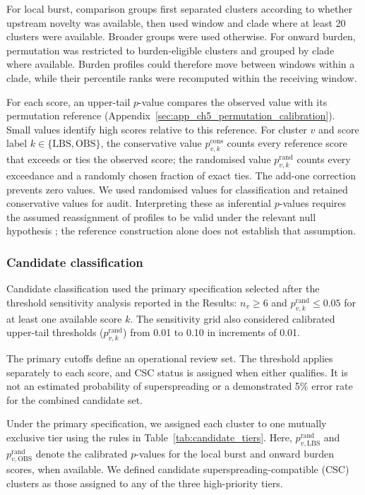 For local burst, comparison groups first separated clusters according to whether upstream novelty was available, then used window and clade where at least 20 clusters were available. Broader groups were used otherwise. For onward burden, permutation was restricted to burden-eligible clusters and grouped by clade where available. Burden profiles could therefore move between windows within a clade, while their percentile ranks were recomputed within the receiving window.

For each score, an upper-tail $p$-value compares the observed value with its permutation reference (Appendix~\ref{sec:app_ch5_permutation_calibration}). Small values identify high scores relative to this reference. For cluster $v$ and score label $k\in\{\mathrm{LBS},\mathrm{OBS}\}$, the conservative value $p_{v,k}^{\mathrm{cons}}$ counts every reference score that exceeds or ties the observed score; the randomised value $p_{v,k}^{\mathrm{rand}}$ counts every exceedance and a randomly chosen fraction of exact ties. The add-one correction prevents zero values. We used randomised values for classification and retained conservative values for audit. Interpreting these as inferential $p$-values requires the assumed reassignment of profiles to be valid under the relevant null hypothesis \citep{Hemerik2017}; the reference construction alone does not establish that assumption.

\subsubsection*{Candidate classification}

Candidate classification used the primary specification selected after the threshold sensitivity analysis reported in the Results: $n_v \geq 6$ and $p_{v,k}^{\mathrm{rand}} \leq 0.05$ for at least one available score $k$. The sensitivity grid also considered calibrated upper-tail thresholds ($p_{v,k}^{\mathrm{rand}}$) from 0.01 to 0.10 in increments of 0.01.

The primary cutoffs define an operational review set. The threshold applies separately to each score, and CSC status is assigned when either qualifies. It is not an estimated probability of superspreading or a demonstrated 5\% error rate for the combined candidate set.

Under the primary specification, we assigned each cluster to one mutually exclusive tier using the rules in Table~\ref{tab:candidate_tiers}. Here, $p_{v,\mathrm{LBS}}^{\mathrm{rand}}$ and $p_{v,\mathrm{OBS}}^{\mathrm{rand}}$ denote the calibrated $p$-values for the local burst and onward burden scores, when available. We defined candidate superspreading-compatible (CSC) clusters as those assigned to any of the three high-priority tiers.

